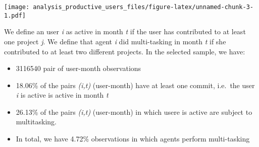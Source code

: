 \documentclass[
]{article}
\newenvironment{Shaded}{\begin{snugshade}}{\end{snugshade}}
\newcommand{\DecValTok}[1]{\textcolor[rgb]{0.00,0.00,0.81}{#1}}
\newcommand{\KeywordTok}[1]{\textcolor[rgb]{0.13,0.29,0.53}{\textbf{#1}}}
\newcommand{\NormalTok}[1]{#1}
\newcommand{\OperatorTok}[1]{\textcolor[rgb]{0.81,0.36,0.00}{\textbf{#1}}}
\newcommand{\StringTok}[1]{\textcolor[rgb]{0.31,0.60,0.02}{#1}}
\providecommand{\tightlist}{%
  \setlength{\itemsep}{0pt}\setlength{\parskip}{0pt}}
\begin{document}
\texttt{[image: analysis\_productive\_users\_files/figure-latex/unnamed-chunk-3-1.pdf]}

\begin{Shaded}
\end{Shaded}

We define an user \emph{i} as active in month \emph{t} if the user has
contributed to at least one project \emph{j}. We define that agent
\emph{i} did multi-tasking in month \emph{t} if she contributed to at
least two different projects. In the selected sample, we have:

\begin{itemize}
\tightlist
\item
  3116540 pair of user-month observations
\item
  18.06\% of the pairs \emph{(i,t)} (user-month) have at least one
  commit, i.e.~the user \emph{i} is active is active in month \emph{t}
\item
  26.13\% of the pairs \emph{(i,t)} (user-month) in which usere is
  active are subject to multitasking.\\
\item
  In total, we have 4.72\% observations in which agents perform
  multi-tasking
\end{itemize}
\end{document}
